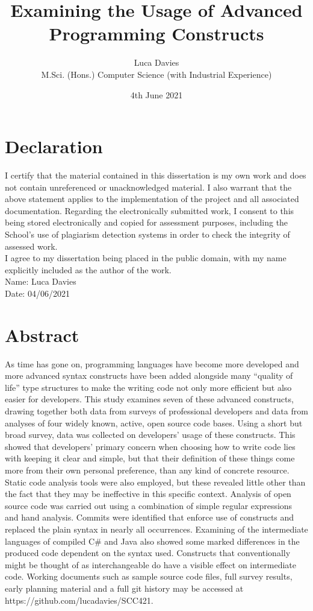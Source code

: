 \documentclass{article}
\title{\textbf{Examining the Usage of Advanced Programming Constructs}}
\author{
Luca Davies \\ M.Sci. (Hons.) Computer Science (with Industrial Experience)}
\date{4th June 2021}
\begin{document}
\maketitle

\newpage
\section*{Declaration}
    I certify that the material contained in this dissertation is my own work and does not contain unreferenced or unacknowledged material. I also warrant that the above statement applies to the implementation of the project and all associated documentation. Regarding the electronically submitted work, I consent to this being stored electronically and copied for assessment purposes, including the School’s use of plagiarism detection systems in order to check the integrity of assessed work. \\
    I agree to my dissertation being placed in the public domain, with my name explicitly included as the author of the work. \\
    
    \noindent
    Name: Luca Davies\\
    Date: 04/06/2021
\newpage
\section*{Abstract}
    As time has gone on, programming languages have become more developed and more advanced syntax constructs have been added alongside many ``quality of life'' type structures to make the writing code not only more efficient but also easier for developers. This study examines seven of these advanced constructs, drawing together both data from surveys of professional developers and data from analyses of four widely known, active, open source code bases. Using a short but broad survey, data was collected on developers' usage of these constructs. This showed that developers' primary concern when choosing how to write code lies with keeping it clear and simple, but that their definition of these things come more from their own personal preference, than any kind of concrete resource. Static code analysis tools were also employed, but these revealed little other than the fact that they may be ineffective in this specific context. Analysis of open source code was carried out using a combination of simple regular expressions and hand analysis. Commits were identified that enforce use of constructs and replaced the plain syntax in nearly all occurrences. Examining of the intermediate languages of compiled C\# and Java also showed some marked differences in the produced code dependent on the syntax used. Constructs that conventionally might be thought of as interchangeable do have a visible effect on intermediate code.
    \newline
    \newline
    Working documents such as sample source code files, full survey results, early planning material and a full git history may be accessed at https://github.com/lucadavies/SCC421.
    \newline
\newpage
\tableofcontents
\end{document}

